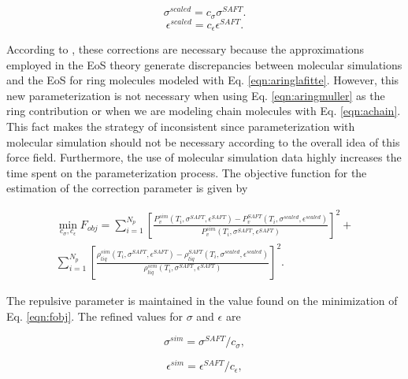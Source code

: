 \begin{equation}
\sigma^{scaled} = c_{\sigma}\sigma^{SAFT}.
\label{eqn:csigma}
\end{equation}
\begin{equation}
\epsilon^{scaled} = c_{\epsilon}\epsilon^{SAFT}.
\label{eqn:ceps}
\end{equation}

According to , these corrections are necessary because the approximations employed in the EoS theory generate discrepancies between molecular simulations and the EoS for ring molecules modeled with Eq. \eqref{eqn:aringlafitte}. However, this new parameterization is not necessary when using Eq. \eqref{eqn:aringmuller} as the ring contribution or when we are modeling chain molecules with Eq. \ref{eqn:achain}. This fact makes the strategy of  inconsistent since parameterization with molecular simulation should not be necessary according to the overall idea of this force field. Furthermore, the use of molecular simulation data highly increases the time spent on the parameterization process. The objective function for the estimation of the correction parameter is given by

\begin{equation}
\begin{split}
\min\limits_{c_{\sigma},c_{\epsilon}} F_{obj}= \sum_{i=1}^{N_{p}} \left[\frac{P_{v}^{sim}(T_{i},\sigma^{SAFT},\epsilon^{SAFT})-P_{v}^{SAFT}(T_{i},\sigma^{scaled},\epsilon^{scaled})}{P_{v}^{sim}(T_{i},\sigma^{SAFT},\epsilon^{SAFT})} \right]^2 + \\
\sum_{i=1}^{N_{p}} \left[\frac{\rho_{liq}^{sim}(T_{i},\sigma^{SAFT},\epsilon^{SAFT})-\rho_{liq}^{SAFT}(T_{i},\sigma^{scaled},\epsilon^{scaled})}{\rho_{liq}^{sim}(T_{i},\sigma^{SAFT},\epsilon^{SAFT})} \right]^2 .
\end{split}
\label{eqn:fobjla}
\end{equation}

The repulsive parameter is maintained in the value found on the minimization of Eq. \eqref{eqn:fobj}. The refined values for $\sigma$ and $\epsilon$ are

\begin{equation}
\sigma^{sim} = \sigma^{SAFT}/c_{\sigma},
\label{eqn:simsigma}
\end{equation}

\begin{equation}
\epsilon^{sim} = \epsilon^{SAFT}/c_{\epsilon},
\label{eqn:simeps}
\end{equation}


